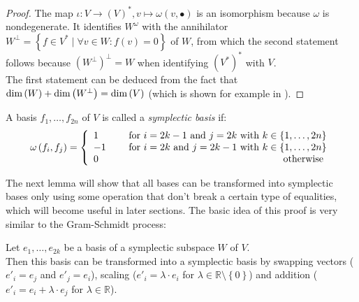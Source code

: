 \documentclass[../SymplecticSimplices.tex]{subfiles}
\begin{document}
\begin{proof}
  The map \( \iota \colon V \rightarrow \left( V \right)^\ast, v \mapsto \omega \left( v, \bullet \right) \) is an isomorphism because \( \omega \) is nondegenerate. It identifies \( W^\omega \) with the annihilator \( W^\bot = \left\lbrace f \in V^\ast \mid \forall v \in W: f \left( v \right) = 0 \right\rbrace \) of \( W \), from which the second statement follows because \( \left( W^\bot \right)^\bot = W \) when identifying \( \left( V^\ast \right)^\ast \) with \( V \).\\
  The first statement can be deduced from the fact that \( \textnormal{dim} \left( W \right) + \textnormal{dim} \left( W^\bot \right) = \textnormal{dim} \left( V \right) \) (which is shown for example in \cite[Page 333]{fischer}).
\end{proof}

A basis \( f_1, \dots, f_{2n} \) of \( V \) is called a \textit{symplectic basis} if: 
\begin{align*}
  \omega \left( f_i, f_j \right) =
  \left\lbrace
  \begin{array}{llr}
    1 && \textnormal{ for } i = 2k - 1 \textnormal{ and } j = 2k \textnormal{ with } k \in \left\lbrace 1, \dots, 2n \right\rbrace \\
    -1 && \textnormal{ for } i = 2k \textnormal{ and } j = 2k - 1 \textnormal{ with } k \in \left\lbrace 1, \dots, 2n \right\rbrace \\
    0 && \textnormal{ otherwise }
  \end{array}
  \right.
\end{align*}

The next lemma will show that all bases can be transformed into symplectic bases only using some operation that don't break a certain type of equalities, which will become useful in later sections. The basic idea of this proof is very similar to the Gram-Schmidt process:

\begin{lemma}
  \label{lemma:symplecticbasis}
  Let \( e_1, \dots, e_{2k} \) be a basis of a symplectic subspace \( W \) of \( V \).\\
  Then this basis can be transformed into a symplectic basis by swapping vectors (\( e'_i = e_j \) and \(e'_j = e_i\)), scaling (\( e'_i = \lambda \cdot e_i \) for \( \lambda \in \mathbb{R} \setminus \left\lbrace 0 \right\rbrace \)) and addition (\( e'_i = e_i + \lambda \cdot e_j\) for \(  \lambda \in \mathbb{R} \)).
\end{lemma}
\end{document}
